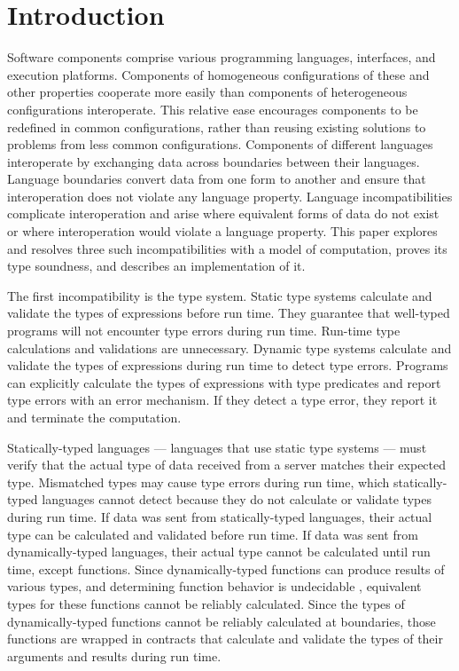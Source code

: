 \chapter{Introduction}

Software components comprise various programming languages, interfaces, and execution platforms.  Components of homogeneous configurations of these and other properties cooperate more easily than components of heterogeneous configurations interoperate.  This relative ease encourages components to be redefined in common configurations, rather than reusing existing solutions to problems from less common configurations.  Components of different languages interoperate by exchanging data across boundaries between their languages.  Language boundaries convert data from one form to another and ensure that interoperation does not violate any language property.  Language incompatibilities complicate interoperation and arise where equivalent forms of data do not exist or where interoperation would violate a language property.  This paper explores and resolves three such incompatibilities with a model of computation, proves its type soundness, and describes an implementation of it.

The first incompatibility is the type system.  Static type systems calculate and validate the types of expressions before run time.  They guarantee that well-typed programs will not encounter type errors during run time.  Run-time type calculations and validations are unnecessary.  Dynamic type systems calculate and validate the types of expressions during run time to detect type errors.  Programs can explicitly calculate the types of expressions with type predicates and report type errors with an error mechanism.  If they detect a type error, they report it and terminate the computation.

Statically-typed languages --- languages that use static type systems --- must verify that the actual type of data received from a server matches their expected type.  Mismatched types may cause type errors during run time, which statically-typed languages cannot detect because they do not calculate or validate types during run time.  If data was sent from statically-typed languages, their actual type can be calculated and validated before run time.  If data was sent from dynamically-typed languages, their actual type cannot be calculated until run time, except functions.  Since dynamically-typed functions can produce results of various types, and determining function behavior is undecidable \cite{blume04}, equivalent types for these functions cannot be reliably calculated.  Since the types of dynamically-typed functions cannot be reliably calculated at boundaries, those functions are wrapped in contracts \cite{findler02} that calculate and validate the types of their arguments and results during run time.

